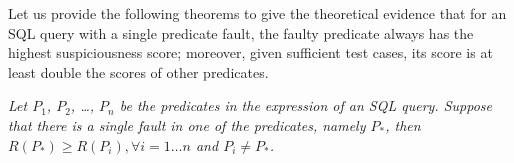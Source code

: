 
%


Let us provide the following theorems to give the theoretical evidence
that for an SQL query with a single predicate fault, the faulty
predicate always has the highest suspiciousness score; moreover, given
sufficient test cases, its score is at least double the scores of
other predicates.

\begin{theorem}
\label{thm1}
{\em Let $P_1$, $P_2$, \ldots, $P_n$ be the predicates in the 
expression of an SQL query. Suppose that there is a single fault in
one of the predicates, namely $P_*$, then $R(P_*) \ge R(P_i), \forall
i = 1 \ldots n$ and $P_i \neq P_*$.}
\end{theorem}

